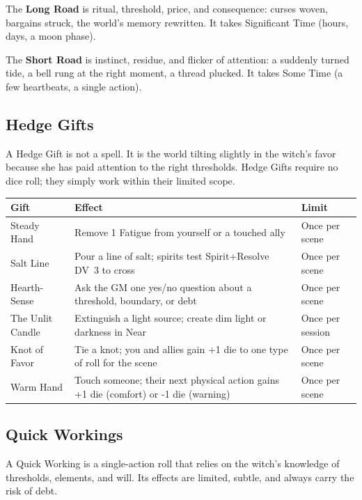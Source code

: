 \documentclass[11pt,letterpaper]{article}
\newcommand{\term}[1]{\textbf{#1}}
\newcommand{\dv}[1]{\textsc{DV}~#1}
\begin{document}
The \term{Long Road} is ritual, threshold, price, and consequence: curses woven, bargains struck, the world's memory rewritten. It takes Significant Time (hours, days, a moon phase).

The \term{Short Road} is instinct, residue, and flicker of attention: a suddenly turned tide, a bell rung at the right moment, a thread plucked. It takes Some Time (a few heartbeats, a single action).

\subsection{Hedge Gifts}

A Hedge Gift is not a spell. It is the world tilting slightly in the witch's favor because she has paid attention to the right thresholds. Hedge Gifts require no dice roll; they simply work within their limited scope.

\begin{table}[H]
\centering
\begin{tabularx}{0.95\linewidth}{@{}lXX@{}}
\toprule
\textbf{Gift} & \textbf{Effect} & \textbf{Limit} \\
\midrule
Steady Hand & Remove 1 Fatigue from yourself or a touched ally & Once per scene \\
Salt Line & Pour a line of salt; spirits test Spirit+Resolve \dv{3} to cross & Once per scene \\
Hearth-Sense & Ask the GM one yes/no question about a threshold, boundary, or debt & Once per scene \\
The Unlit Candle & Extinguish a light source; create dim light or darkness in Near & Once per session \\
Knot of Favor & Tie a knot; you and allies gain +1 die to one type of roll for the scene & Once per scene \\
Warm Hand & Touch someone; their next physical action gains +1 die (comfort) or -1 die (warning) & Once per scene \\
\bottomrule
\end{tabularx}
\end{table}

\subsection{Quick Workings}

A Quick Working is a single-action roll that relies on the witch's knowledge of thresholds, elements, and will. Its effects are limited, subtle, and always carry the risk of debt.
\end{document}
